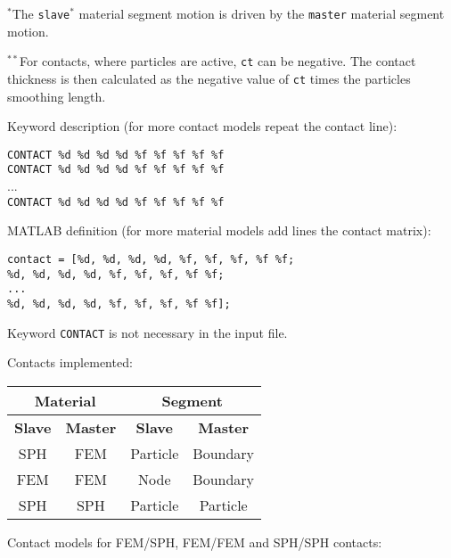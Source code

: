 $^*$The \texttt{slave}$^*$ material segment motion is driven by the \texttt{master} material segment motion.

$^{**}$For contacts, where particles are active, \texttt{ct} can be negative. The contact thickness is then calculated as the negative value of \texttt{ct} times the particles smoothing length.

Keyword description (for more contact models repeat the contact line):

\begin{tcolorbox}
\texttt{CONTACT \%d \%d \%d \%d \%f \%f \%f \%f \%f} \\
\texttt{CONTACT \%d \%d \%d \%d \%f \%f \%f \%f \%f} \\
... \\
\texttt{CONTACT \%d \%d \%d \%d \%f \%f \%f \%f \%f}
\end{tcolorbox}

MATLAB definition (for more material models add lines the contact matrix):

\begin{tcolorbox}
\texttt{contact = [\%d, \%d, \%d, \%d, \%f, \%f, \%f, \%f \%f; \\
\%d, \%d, \%d, \%d, \%f, \%f, \%f, \%f \%f; \\
... \\
\%d, \%d, \%d, \%d, \%f, \%f, \%f, \%f \%f];}
\end{tcolorbox}

Keyword \texttt{CONTACT} is not necessary in the input file.

Contacts implemented:

\begin{tabular}{|c|c|c|c|}
\hline
\multicolumn{2}{|c|}{\bf Material} & \multicolumn{2}{c|}{\bf Segment} \\ \hline
{\bf Slave} & {\bf Master} & {\bf Slave} & {\bf Master} \\ \hline
SPH & FEM & Particle & Boundary \\ \hline
FEM & FEM & Node & Boundary \\ \hline
SPH & SPH & Particle & Particle \\ \hline
\end{tabular}

Contact models for FEM/SPH, FEM/FEM and SPH/SPH contacts:

